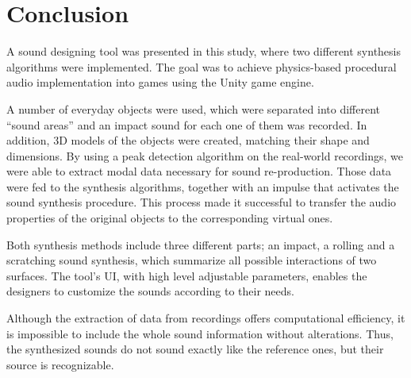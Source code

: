 \chapter{Conclusion}

A sound designing tool was presented in this study, where two different synthesis algorithms were implemented. The goal was to achieve physics-based procedural audio implementation into games using the Unity\textsuperscript{\textregistered} game engine. 

A number of everyday objects were used, which were separated into different ``sound areas'' and an impact sound for each one of them was recorded. In addition, 3D models of the objects were created, matching their shape and dimensions. By using a peak detection algorithm on the real-world recordings, we were able to extract modal data necessary for sound re-production. Those data were fed to the synthesis algorithms, together with an impulse that activates the sound synthesis procedure. This process made it successful to transfer the audio properties of the original objects to the corresponding virtual ones.

Both synthesis methods include three different parts; an impact, a rolling and a scratching sound synthesis, which summarize all possible interactions of two surfaces. The tool's \gls{UI}, with high level adjustable parameters, enables the designers to customize the sounds according to their needs.

Although the extraction of data from recordings offers computational efficiency, it is impossible to include the whole sound information without alterations. Thus, the synthesized sounds do not sound exactly like the reference ones, but their source is recognizable. 